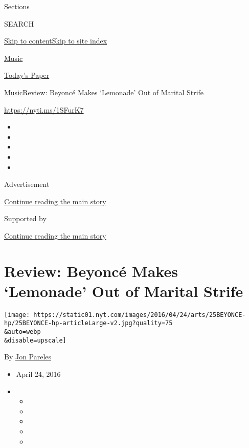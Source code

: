Sections

SEARCH

\protect\hyperlink{site-content}{Skip to
content}\protect\hyperlink{site-index}{Skip to site index}

\href{https://www.nytimes.com/section/arts/music}{Music}

\href{https://myaccount.nytimes.com/auth/login?response_type=cookie\&client_id=vi}{}

\href{https://www.nytimes.com/section/todayspaper}{Today's Paper}

\href{/section/arts/music}{Music}\textbar{}Review: Beyoncé Makes
`Lemonade' Out of Marital Strife

\url{https://nyti.ms/1SFurK7}

\begin{itemize}
\item
\item
\item
\item
\item
\end{itemize}

Advertisement

\protect\hyperlink{after-top}{Continue reading the main story}

Supported by

\protect\hyperlink{after-sponsor}{Continue reading the main story}

\hypertarget{review-beyoncuxe9-makes-lemonade-out-of-marital-strife}{%
\section{Review: Beyoncé Makes `Lemonade' Out of Marital
Strife}\label{review-beyoncuxe9-makes-lemonade-out-of-marital-strife}}

\texttt{[image: https://static01.nyt.com/images/2016/04/24/arts/25BEYONCE-hp/25BEYONCE-hp-articleLarge-v2.jpg?quality=75\\\&auto=webp\\\&disable=upscale]}

By \href{http://www.nytimes.com/by/jon-pareles}{Jon Pareles}

\begin{itemize}
\item
  April 24, 2016
\item
  \begin{itemize}
  \item
  \item
  \item
  \item
  \item
  \end{itemize}
\end{itemize}

